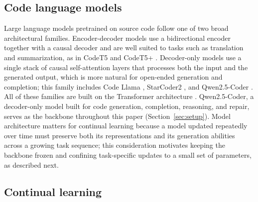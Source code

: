 \subsection{Code language models}
\label{sec:clm_background}

Large language models pretrained on source code follow one of two broad architectural families. Encoder-decoder models use a bidirectional encoder together with a causal decoder and are well suited to tasks such as translation and summarization, as in CodeT5 \citep{wang2021codet5} and CodeT5+ \citep{wang2023codet5plus}. Decoder-only models use a single stack of causal self-attention layers that processes both the input and the generated output, which is more natural for open-ended generation and completion; this family includes Code Llama \citep{roziere2023codellama}, StarCoder2 \citep{lozhkov2024starcoder2}, and Qwen2.5-Coder \citep{hui2024qwen25coder}. All of these families are built on the Transformer architecture \citep{vaswani2017attention}. Qwen2.5-Coder, a decoder-only model built for code generation, completion, reasoning, and repair, serves as the backbone throughout this paper (Section~\ref{sec:setup}). Model architecture matters for continual learning because a model updated repeatedly over time must preserve both its representations and its generation abilities across a growing task sequence; this consideration motivates keeping the backbone frozen and confining task-specific updates to a small set of parameters, as described next.

\subsection{Continual learning}
\label{sec:cl_background}

